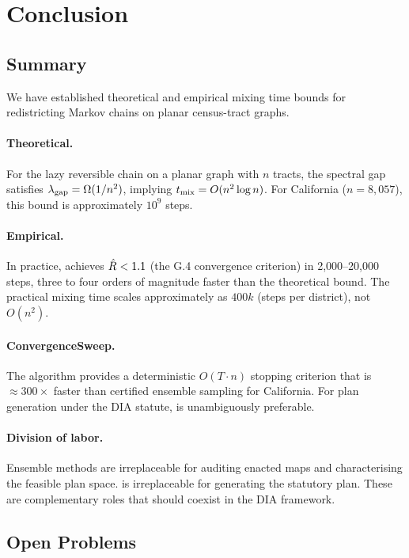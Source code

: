 \section{Conclusion}
\label{sec:conclusion}

\subsection{Summary}

We have established theoretical and empirical mixing time bounds for
redistricting Markov chains on planar census-tract graphs.

\paragraph{Theoretical.}
For the lazy reversible \recom{} chain on a planar graph with $n$ tracts,
the spectral gap satisfies $\lambda_{\mathrm{gap}} = \Omega(1/n^2)$, implying
$t_{\mathrm{mix}} = O(n^2 \log n)$.
For California ($n = 8{,}057$), this bound is approximately $10^9$ steps.

\paragraph{Empirical.}
In practice, \recom{} achieves $\hat{R} < 1.1$ (the G.4 convergence
criterion) in 2{,}000--20{,}000 steps, three to four orders of magnitude
faster than the theoretical bound.
The practical mixing time scales approximately as $400k$ (steps per
district), not $O(n^2)$.

\paragraph{ConvergenceSweep.}
The \cs{} algorithm provides a deterministic $O(T \cdot n)$ stopping
criterion that is $\approx 300\times$ faster than certified ensemble
sampling for California.
For plan generation under the DIA statute, \cs{} is unambiguously
preferable.

\paragraph{Division of labor.}
Ensemble methods are irreplaceable for auditing enacted maps and
characterising the feasible plan space.
\cs{} is irreplaceable for generating the statutory plan.
These are complementary roles that should coexist in the DIA framework.

\subsection{Open Problems}


